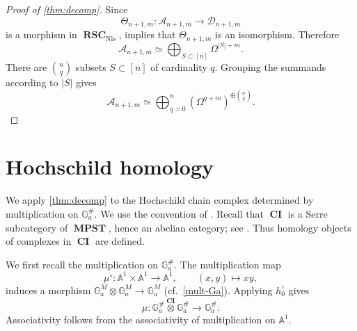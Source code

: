 \documentclass[a4paper,12pt,reqno]{amsart}
\numberwithin{equation}{section}
\theoremstyle{definition}
\newcommand{\bA}{\mathbb{A}}
\newcommand{\bcube}{{\overline{\square}}}
\newcommand{\RSC}{{\operatorname{\mathbf{RSC}}}}
\newcommand{\CI}{\operatorname{\mathbf{CI}}}
\newcommand{\MPST}{\operatorname{\mathbf{MPST}}}
\newcommand{\Acal}{\mathcal{A}}
\newcommand{\Dcal}{\mathcal{D}}
\newcommand{\GaMod}{\mathbb{G}_{a}^{M}}
\newcommand{\GaSharp}{\mathbb{G}_{a}^{\#}}
\newcommand{\Nis}{\mathrm{Nis}}
\newcommand{\Gapair}{\mathcal{G}_a}
\begin{document}
\begin{proof}[Proof of \autoref{thm:decomp}]
Since
\[
 \Theta_{n+1,m}:\Acal_{n+1,m}\to\Dcal_{n+1,m}
\]
is a morphism in $\RSC_{\Nis}$, \cite[Lemma~4.16]{RSY22} implies that
$\Theta_{n+1,m}$ is an isomorphism.  Therefore
\[
 \Acal_{n+1,m}
 \simeq
 \bigoplus_{S\subset[n]}\Omega^{|S|+m}.
\]
There are $\binom nq$ subsets $S\subset[n]$ of cardinality $q$.
Grouping the summands according to $|S|$ gives
\[
 \Acal_{n+1,m}
 \simeq
 \bigoplus_{q=0}^{n}
 (\Omega^{q+m})^{\oplus\binom nq}.
\]
\end{proof}





\section{Hochschild homology}\label{sec:HH}

We apply \autoref{thm:decomp} to the Hochschild chain complex determined by
multiplication on $\GaSharp$.  
We use the convention of \cite[Section~1.1]{Lod98}.
Recall that $\CI$ is a Serre subcategory of
$\MPST$, hence an abelian category; see \cite[Section~3.6]{RSY22}.  Thus
homology objects of complexes in $\CI$ are defined. 

We first recall the multiplication on $\GaSharp$.
The multiplication map
\[
 \mu^\circ:\bA^1\times\bA^1\to\bA^1,
 \qquad
 (x,y)\mapsto xy,
\]
induces a
morphism $\GaMod\otimes\GaMod\to\GaMod$ (cf.~\eqref{mult-Ga}).
Applying $h_0^{\bcube}$ gives
\begin{equation}\label{eq:HH-mult}
 \mu:\GaSharp\overset{\CI}{\otimes}\GaSharp\to\GaSharp.
\end{equation}
Associativity follows from the associativity of multiplication on
$\bA^1$.  
\end{document}

